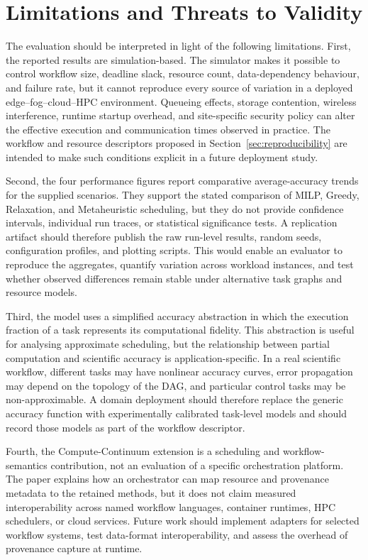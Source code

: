 \section{Limitations and Threats to Validity}
\label{sec:validity}

The evaluation should be interpreted in light of the following limitations. First, the reported results are simulation-based. The simulator makes it possible to control workflow size, deadline slack, resource count, data-dependency behaviour, and failure rate, but it cannot reproduce every source of variation in a deployed edge--fog--cloud--HPC environment. Queueing effects, storage contention, wireless interference, runtime startup overhead, and site-specific security policy can alter the effective execution and communication times observed in practice. The workflow and resource descriptors proposed in Section~\ref{sec:reproducibility} are intended to make such conditions explicit in a future deployment study.

Second, the four performance figures report comparative average-accuracy trends for the supplied scenarios. They support the stated comparison of MILP, Greedy, Relaxation, and Metaheuristic scheduling, but they do not provide confidence intervals, individual run traces, or statistical significance tests. A replication artifact should therefore publish the raw run-level results, random seeds, configuration profiles, and plotting scripts. This would enable an evaluator to reproduce the aggregates, quantify variation across workload instances, and test whether observed differences remain stable under alternative task graphs and resource models.

Third, the model uses a simplified accuracy abstraction in which the execution fraction of a task represents its computational fidelity. This abstraction is useful for analysing approximate scheduling, but the relationship between partial computation and scientific accuracy is application-specific. In a real scientific workflow, different tasks may have nonlinear accuracy curves, error propagation may depend on the topology of the DAG, and particular control tasks may be non-approximable. A domain deployment should therefore replace the generic accuracy function with experimentally calibrated task-level models and should record those models as part of the workflow descriptor.

Fourth, the Compute-Continuum extension is a scheduling and workflow-semantics contribution, not an evaluation of a specific orchestration platform. The paper explains how an orchestrator can map resource and provenance metadata to the retained methods, but it does not claim measured interoperability across named workflow languages, container runtimes, HPC schedulers, or cloud services. Future work should implement adapters for selected workflow systems, test data-format interoperability, and assess the overhead of provenance capture at runtime.

